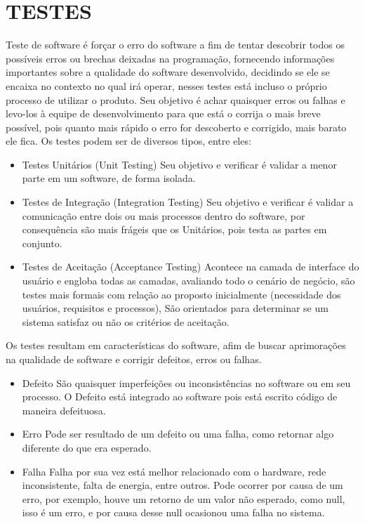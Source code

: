 \documentclass[12pt]{article}
\begin{document}
    \section{TESTES}
        Teste de software é forçar o erro do software a fim de tentar descobrir todos os possíveis erros ou brechas deixadas na programação, fornecendo informações importantes sobre a qualidade do software desenvolvido, decidindo se ele se encaixa no contexto no qual irá operar, nesses testes está incluso o próprio processo de utilizar o produto. Seu objetivo é achar quaisquer erros ou falhas e levo-los à equipe de desenvolvimento para que está o corrija o mais breve possível, pois quanto mais rápido o erro for descoberto e corrigido, mais barato ele fica. Os testes podem ser de diversos tipos, entre eles:
        
        \begin{itemize}
            \item Testes Unitários (Unit Testing)
                Seu objetivo e verificar é validar a menor parte em um software, de forma isolada.
            \item Testes de Integração (Integration Testing)
                Seu objetivo e verificar é validar a comunicação entre dois ou mais processos dentro do software, por consequência são mais frágeis que os Unitários, pois testa as partes em conjunto.
            \item Testes de Aceitação (Acceptance Testing)
                Acontece na camada de interface  do usuário e engloba todas as camadas, avaliando todo o cenário de negócio, são testes mais formais com relação ao proposto inicialmente (necessidade dos usuários, requisitos e processos), São orientados para determinar se um sistema satisfaz ou não os critérios de aceitação. 
        \end{itemize}
        Os testes resultam em características do software, afim de buscar aprimorações na qualidade de software e corrigir defeitos, erros ou falhas.
        
        \begin{itemize}
            \item Defeito
                São quaisquer imperfeições ou inconsistências no software ou em seu processo. O Defeito está integrado ao software pois está escrito código de maneira defeituosa.
            \item Erro
                Pode ser resultado de um defeito ou uma falha, como retornar algo diferente do que era esperado.
            \item Falha
                Falha por sua vez está melhor relacionado com o hardware, rede inconsistente, falta de energia, entre outros. Pode ocorrer por causa de um erro, por exemplo, houve um retorno de um valor não esperado, como null, isso é um erro, e por causa desse null ocasionou uma falha no sistema.
        \end{itemize}
    
\end{document}
